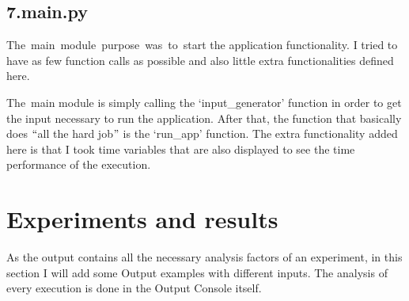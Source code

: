 \documentclass[12pt]{article}
\begin{document}
\subsection*{7.\hspace*{10pt}main.py}
\begin{justify}
 \tab The\ main\ module\ purpose\ was\ to\ start the application functionality. I tried to have       as few function calls as possible and also little extra functionalities defined here. 
\end{justify}\par

\begin{justify}
\tab The\ main  module is simply calling the ‘input\_generator’ function in order to get the input necessary to run the application. After that, the function that basically does $``$all the hard job$"$  is the ‘run\_app’ function. The extra functionality added here is that I took time variables that are also displayed to see the time performance of the execution.
\end{justify}\par


\vspace{\baselineskip}
\section*{Experiments and results}
\begin{justify}
As the output contains all the necessary analysis factors of an experiment, in this section I will add some Output examples with different inputs. The analysis of every execution is done in the Output Console itself.
\end{justify}\par


\vspace{\baselineskip}


\end{document}
